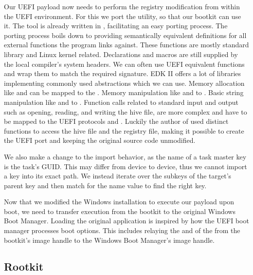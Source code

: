 Our \ac{UEFI} payload now needs to perform the registry modification from within the \ac{UEFI} environment.
For this we port the  utility, so that our bootkit can use it.
The tool is already written in , facilitating an easy porting process.
The porting process boils down to providing semantically equivalent definitions for all external functions the program links against.
These functions are mostly  standard library and Linux kernel related.
Declarations and macros are still supplied by the local compiler's system headers.
We can often use \ac{UEFI} equivalent functions and wrap them to match the required signature.
\ac{EDK} II offers a lot of libraries implementing commonly used abstractions which we can use.
Memory allocation like  and  can be mapped to the .
Memory manipulation like  and  to .
Basic string manipulation like  and  to .
Function calls related to standard input and output such as opening, reading, and writing the hive file, are more complex and have to be mapped to the \ac{UEFI} protocols  and .
Luckily the author of  used distinct functions to access the hive file and the registry file, making it possible to create the \ac{UEFI} port and keeping the original source code unmodified.

We also make a change to the import behavior, as the name of a task master key is the task's \ac{GUID}.
This may differ from device to device, thus we cannot import a key into its exact path.
We instead iterate over the subkeys of the target's parent key and then match for the name value to find the right key.

Now that we modified the Windows installation to execute our payload upon boot, we need to transfer execution from the bootkit to the original Windows Boot Manager.
Loading the original application is inspired by how the \ac{UEFI} boot manager processes boot options.
This includes relaying the  and  of the  from the bootkit's image handle to the Windows Boot Manager's image handle.

\subsection{Rootkit}


